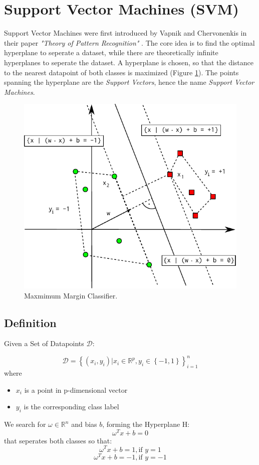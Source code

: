 \section{Support Vector Machines (SVM)}
Support Vector Machines were first introduced by Vapnik and Chervonenkis in their paper \textit{"Theory of Pattern Recognition"} \cite{VC74}. The core idea is to find the optimal hyperplane to seperate a dataset, while there are theoretically infinite hyperplanes to seperate the dataset. A hyperplane is chosen, so that the distance to the nearest datapoint of both classes is maximized (Figure \ref{fig:maximum_margin}). The points spanning the hyperplane are the \textit{Support Vectors}, hence the name \textit{Support Vector Machines}. \cite{VC95}

\begin{figure}
\begin{center}
\includegraphics[scale=0.7]{img/svm/margin.pdf}
\end{center}
 \caption{Maxmimum Margin Classifier.}
 \label{fig:maximum_margin}
\end{figure}

\subsection{Definition}
Given a Set of Datapoints $\mathcal{D}$:

$$\mathcal{D} = \left\{(x_i, y_i) | x_i \in \mathbb{R}^p, y_i \in \left\{-1,1\right\}\right\}_{i=1}^n$$
where
\begin{itemize}
 \item $x_i$ is a point in p-dimensional vector
 \item $y_i$ is the corresponding class label
\end{itemize}
We search for $\omega \in \mathbb{R}^n$ and bias $b$, forming the Hyperplane H:
$$\omega^T x + b = 0$$
that seperates both classes so that:
$$ \omega^T x + b = 1,\mbox{if } y = 1 $$
$$ \omega^T x + b = -1, \mbox{if } y = -1 $$

